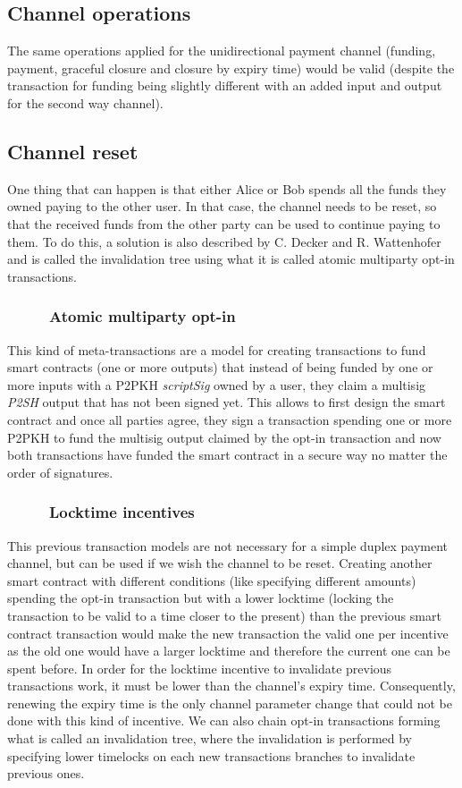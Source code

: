 \documentclass[12pt,journal,compsoc]{IEEEtran}
\begin{document}
\subsection{Channel operations}
The same operations applied for the unidirectional payment channel (funding, payment, graceful closure and closure by expiry time) would be valid (despite the transaction for funding being slightly different with an added input and output for the second way channel).
\subsection{Channel reset}
One thing that can happen is that either Alice or Bob spends all the funds they owned paying to the other user. In that case, the channel needs to be reset, so that the received funds from the other party can be used to continue paying to them. To do this, a solution is also described by C. Decker and R. Wattenhofer\cite{decker2015fast} and is called the invalidation tree using what it is called atomic multiparty opt-in transactions.
\subsubsection{\ \ \ \ \ Atomic multiparty opt-in}
This kind of meta-transactions are a model for creating transactions to fund smart contracts (one or more outputs) that instead of being funded by one or more inputs with a P2PKH \textit{scriptSig} owned by a user, they claim a multisig \textit{P2SH} output that has not been signed yet. This allows to first design the smart contract and once all parties agree, they sign a transaction spending one or more P2PKH to fund the multisig output claimed by the opt-in transaction and now both transactions have funded the smart contract in a secure way no matter the order of signatures.
\subsubsection{\ \ \ \ \ Locktime incentives}
This previous transaction models are not necessary for a simple duplex payment channel, but can be used if we wish the channel to be reset. Creating another smart contract with different conditions (like specifying different amounts) spending the opt-in transaction but with a lower locktime (locking the transaction to be valid to a time closer to the present) than the previous smart contract transaction would make the new transaction the valid one per incentive as the old one would have a larger locktime and therefore the current one can be spent before. In order for the locktime incentive to invalidate previous transactions work, it must be lower than the channel's expiry time. Consequently, renewing the expiry time is the only channel parameter change that could not be done with this kind of incentive. We can also chain opt-in transactions forming what is called an invalidation tree, where the invalidation is performed by specifying lower timelocks on each new transactions branches to invalidate previous ones.
\end{document}
